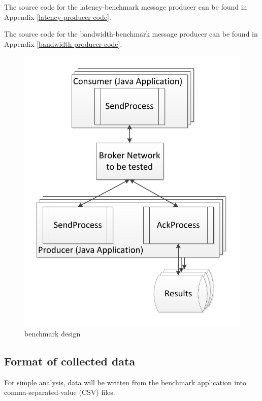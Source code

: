 \documentclass{thesis}
\begin{document}
The source code for the latency-benchmark message producer can be found in Appendix \ref{latency-producer-code}.

The source code for the bandwidth-benchmark message producer can be found in Appendix \ref{bandwidth-producer-code}.

\begin{figure}[h]
\centering
\label{Benchmark Design}
\includegraphics{benchmark_design}  
\caption{benchmark design}
\end{figure}

\subsection{Format of collected data}
For simple analysis, data will be written from the benchmark application into comma-separated-value (CSV) files.  
\end{document}
